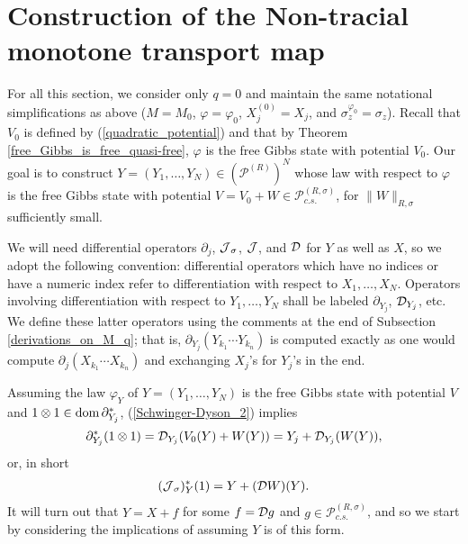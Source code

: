
\section{Construction of the Non-tracial monotone transport map}\label{construction}

For all this section, we consider only $q=0$ and maintain the same notational simplifications as above ($M=M_0$, $\varphi=\varphi_0$, $X_j^{(0)}=X_j$, and $\sigma^{\varphi_0}_{z}=\sigma_z$).  Recall that $V_0$ is defined by (\ref{quadratic_potential}) and that by Theorem \ref{free_Gibbs_is_free_quasi-free}, $\varphi$ is the free Gibbs state with potential $V_0$. Our goal is to construct $Y=(Y_1,\ldots, Y_N)\in (\mathscr{P}^{(R)})^N$ whose law with respect to $\varphi$ is the free Gibbs state with potential $V=V_0+W \in \mathscr{P}^{(R,\sigma)}_{c.s.}$, for $\|W\|_{R,\sigma}$ sufficiently small.\par
We will need differential operators $\partial_j$, $\operatorname{\mathcal J}_\sigma$, $\operatorname{\mathcal J}$, and $\mathcal D$ for $Y$ as well as $X$, so we adopt the following convention: differential operators which have no indices or have a numeric index refer to differentiation with respect to $X_1,\ldots, X_N$. Operators involving differentiation with respect to $Y_1,\ldots, Y_N$ shall be labeled $\partial_{Y_j}$, $\mathcal D_{Y_j}$, etc. We define these latter operators using the comments at the end of Subsection \ref{derivations_on_M_q}; that is, $\partial_{Y_j}(Y_{k_1}\cdots Y_{k_n})$ is computed exactly as one would compute $\partial_j(X_{k_1}\cdots X_{k_n})$ and exchanging $X_j$'s for $Y_j$'s in the end.\par
Assuming the law $\varphi_Y$ of $Y=(Y_1,\ldots, Y_N)$ is the free Gibbs state with potential $V$ and $1\otimes 1\in\text{dom}\,\partial_{Y_j}^*$, (\ref{Schwinger-Dyson_2}) implies
	\begin{equation*}
		\partial_{Y_j}^*(1\otimes 1)=\mathcal D_{Y_j} (V_0(Y)+W(Y))=Y_j+\mathcal D_{Y_j}(W(Y)),
	\end{equation*}
or, in short
	\begin{align}\label{Schwinger-Dyson_Y}
		(\operatorname{\mathcal J}_\sigma)_Y^*(1)=Y+(\mathcal D W)(Y).
	\end{align}
It will turn out that $Y=X+f$ for some $f=\mathcal D g$ and $g\in\mathscr{P}^{(R,\sigma)}_{c.s.}$, and so we start by considering the implications of assuming $Y$ is of this form.



